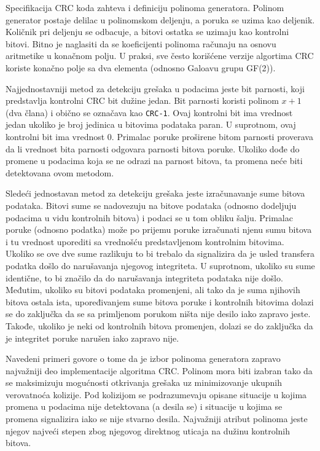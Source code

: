 \documentclass[12pt,oneside]{memoir}
\begin{document}
Specifikacija CRC koda zahteva i definiciju polinoma generatora. Polinom generator postaje delilac u polinomskom deljenju, a poruka se uzima kao deljenik. Količnik pri deljenju se odbacuje, a bitovi ostatka se uzimaju kao kontrolni bitovi. Bitno je naglasiti da se koeficijenti polinoma računaju na osnovu aritmetike u konačnom polju. U praksi, sve često korišćene verzije algortima CRC koriste konačno polje sa dva elementa (odnosno Galoavu grupu GF(2)). 

Najjednostavniji metod za detekciju grešaka u podacima jeste bit parnosti, koji predstavlja kontrolni CRC bit dužine jedan. Bit parnosti koristi polinom $x+1$ (dva člana) i obično se označava kao \texttt{CRC-1}. Ovaj kontrolni bit ima vrednost jedan ukoliko je broj jedinica u bitovima podataka paran. U suprotnom, ovaj kontrolni bit ima vrednost 0. Primalac poruke proširene bitom parnosti proverava da li vrednost bita parnosti odgovara parnosti bitova poruke. Ukoliko dođe do promene u podacima koja se ne odrazi na parnost bitova, ta promena neće biti detektovana ovom metodom.

Sledeći jednostavan metod za detekciju grešaka jeste izračunavanje sume bitova podataka. Bitovi sume se nadovezuju na bitove podataka (odnosno dodeljuju podacima u vidu kontrolnih bitova) i podaci se u tom obliku šalju. Primalac poruke (odnosno podatka) može po prijemu poruke izračunati njenu sumu bitova i tu vrednost uporediti sa vrednošću predstavljenom kontrolnim bitovima. Ukoliko se ove dve sume razlikuju to bi trebalo da signalizira da je usled transfera podatka 
došlo do narušavanja njegovog integriteta. U suprotnom, ukoliko su sume identične, to 
bi značilo da do narušavanja integriteta podataka nije došlo.
Međutim, ukoliko su bitovi podataka promenjeni, 
ali tako da je suma njihovih bitova ostala ista, upoređivanjem sume bitova poruke i 
kontrolnih bitovima dolazi se do zaključka da se sa primljenom 
porukom ništa nije desilo iako zapravo jeste. Takođe, ukoliko je neki od kontrolnih bitova promenjen, dolazi se do zaključka da je integritet poruke narušen iako zapravo nije. 

Navedeni primeri govore o tome da je izbor polinoma generatora zapravo najvažniji deo implementacije algoritma CRC. Polinom mora biti izabran tako da se maksimizuju mogućnosti otkrivanja grešaka uz minimizovanje ukupnih verovatnoća kolizije. Pod kolizijom se podrazumevaju opisane situacije u kojima promena u podacima nije detektovana (a desila se) i situacije u kojima se promena signalizira iako se nije stvarno desila. Najvažniji atribut polinoma jeste njegov najveći stepen zbog njegovog direktnog uticaja na dužinu kontrolnih bitova. 
\end{document}
